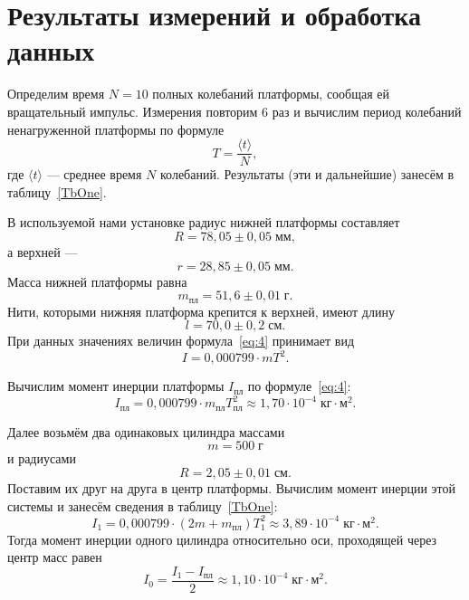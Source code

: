 \section{Результаты измерений и обработка данных}

Определим время $N=10$ полных колебаний платформы, сообщая ей вращательный импульс. Измерения повторим 6 раз и вычислим период колебаний ненагруженной платформы по формуле
\[
T=\frac{\langle t\rangle}{N},
\]
где $\langle t\rangle$ --- среднее время $N$ колебаний. Результаты (эти и дальнейшие) занесём в таблицу~\ref{TbOne}.

В используемой нами установке радиус нижней платформы составляет
\[
R=78{,}05\pm0{,}05\;\text{мм},
\]
а верхней ---
\[
r=28{,}85\pm0{,}05\;\text{мм}.
\]
Масса нижней платформы равна
\[
m_\text{пл}=51{,}6\pm0{,}01\;\text{г}.
\]
Нити, которыми нижняя платформа крепится к верхней, имеют длину
\[
l=70{,}0\pm0{,}2\;\text{см}.
\]
При данных значениях величин формула~\eqref{eq:4} принимает вид
\[
I=0{,}000799\cdot mT^2.
\]

Вычислим момент инерции платформы $I_\text{пл}$ по формуле~\eqref{eq:4}:
\[
I_\text{пл}=0{,}000799\cdot m_\text{пл}T_\text{пл}^2\approx1{,}70\cdot10^{-4}\;\text{кг$\cdot$м$^2$}.
\]

Далее возьмём два одинаковых цилиндра массами
\[
m=500\;\text{г}
\]
и радиусами
\[
R=2{,}05\pm0{,}01\;\text{см}.
\]
Поставим их друг на друга в центр платформы. Вычислим момент инерции этой системы и занесём сведения в таблицу~\ref{TbOne}:
\[
I_{1}=0{,}000799\cdot(2m+m_\text{пл})T_{1}^2\approx3{,}89\cdot10^{-4}\;\text{кг$\cdot$м$^2$}.
\]
Тогда момент инерции одного цилиндра относительно оси, проходящей через центр масс равен
\[
I_0=\frac{I_{1}-I_\text{пл}}{2}\approx1{,}10\cdot10^{-4}\;\text{кг$\cdot$м$^2$}.
\]


